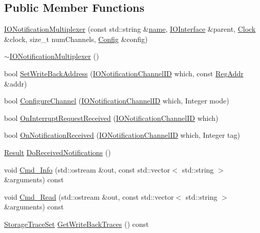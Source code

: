 \subsection*{Public Member Functions}
\begin{DoxyCompactItemize}
\item 
\hyperlink{class_simulator_1_1drisc_1_1_i_o_notification_multiplexer_abe79d7157ac52e6fd6f321d117b2cd58}{I\+O\+Notification\+Multiplexer} (const std\+::string \&\hyperlink{mtconf_8c_a8f8f80d37794cde9472343e4487ba3eb}{name}, \hyperlink{class_simulator_1_1drisc_1_1_i_o_interface}{I\+O\+Interface} \&parent, \hyperlink{class_simulator_1_1_clock}{Clock} \&clock, size\+\_\+t num\+Channels, \hyperlink{class_config}{Config} \&config)
\item 
\hyperlink{class_simulator_1_1drisc_1_1_i_o_notification_multiplexer_a4d3908e2a6843f3fe29919160ebb8fa4}{$\sim$\+I\+O\+Notification\+Multiplexer} ()
\item 
bool \hyperlink{class_simulator_1_1drisc_1_1_i_o_notification_multiplexer_adc52c0f29fe6a719c0a944f21597c9ba}{Set\+Write\+Back\+Address} (\hyperlink{namespace_simulator_a951e1bf3ee91c11c980382a7bcbba287}{I\+O\+Notification\+Channel\+I\+D} which, const \hyperlink{struct_simulator_1_1_reg_addr}{Reg\+Addr} \&addr)
\item 
bool \hyperlink{class_simulator_1_1drisc_1_1_i_o_notification_multiplexer_a576117abf1dc9a925ab7436c55802c98}{Configure\+Channel} (\hyperlink{namespace_simulator_a951e1bf3ee91c11c980382a7bcbba287}{I\+O\+Notification\+Channel\+I\+D} which, Integer mode)
\item 
bool \hyperlink{class_simulator_1_1drisc_1_1_i_o_notification_multiplexer_a57fae78b25090725f632abc1be084a5d}{On\+Interrupt\+Request\+Received} (\hyperlink{namespace_simulator_a951e1bf3ee91c11c980382a7bcbba287}{I\+O\+Notification\+Channel\+I\+D} which)
\item 
bool \hyperlink{class_simulator_1_1drisc_1_1_i_o_notification_multiplexer_a6d7ac7337dfbe38401d0f4f14e51fe97}{On\+Notification\+Received} (\hyperlink{namespace_simulator_a951e1bf3ee91c11c980382a7bcbba287}{I\+O\+Notification\+Channel\+I\+D} which, Integer tag)
\item 
\hyperlink{namespace_simulator_a4b6b5616e7236c0c131516a441776805}{Result} \hyperlink{class_simulator_1_1drisc_1_1_i_o_notification_multiplexer_a917a5a8aabca32bd42048cc36349f13f}{Do\+Received\+Notifications} ()
\item 
void \hyperlink{class_simulator_1_1drisc_1_1_i_o_notification_multiplexer_a0d51528c58a649bc297d6610c3f04be5}{Cmd\+\_\+\+Info} (std\+::ostream \&out, const std\+::vector$<$ std\+::string $>$ \&arguments) const 
\item 
void \hyperlink{class_simulator_1_1drisc_1_1_i_o_notification_multiplexer_a1865e4784b1f0ec5380f04a60ab3a36b}{Cmd\+\_\+\+Read} (std\+::ostream \&out, const std\+::vector$<$ std\+::string $>$ \&arguments) const 
\item 
\hyperlink{class_simulator_1_1_storage_trace_set}{Storage\+Trace\+Set} \hyperlink{class_simulator_1_1drisc_1_1_i_o_notification_multiplexer_a86e5acf9490a4d5410783d877483fec0}{Get\+Write\+Back\+Traces} () const 
\end{DoxyCompactItemize}
